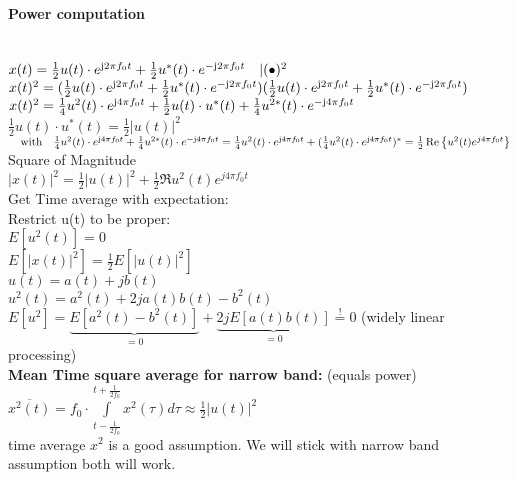 \begin{doublespace}
\ \\


\paragraph{Power computation}\ \\ 
\quad $x(t)=\frac{1}{2}u(t)\cdot e^{\mathrm{j} 2 \pi f_0 t}+\frac{1}{2}u^*(t)\cdot e^{-\mathrm{j} 2 \pi f_0 t} \quad |(\bullet)^2$\\
\quad $x(t)^2=(\frac{1}{2}u(t)\cdot e^{\mathrm{j} 2 \pi f_0 t}+\frac{1}{2}u^*(t)\cdot e^{-\mathrm{j} 2 \pi f_0 t})(\frac{1}{2}u(t)\cdot e^{\mathrm{j} 2 \pi f_0 t}+\frac{1}{2}u^*(t)\cdot e^{-\mathrm{j} 2 \pi f_0 t})$\\
\quad $x(t)^2=\frac{1}{4}u^2(t)\cdot e^{\mathrm{j} 4 \pi f_0 t}
+\frac{1}{2}u(t)\cdot u^*(t)+
\frac{1}{4}u^{2*}(t)\cdot e^{-\mathrm{j} 4 \pi f_0 t}$\\
\with $\frac{1}{2}u(t)\cdot u^*(t)=\frac{1}{2}|u(t)|^2 $\\
$ \quad\textrm{with}\quad \frac{1}{4}u^2(t)\cdot e^{\mathrm{j} 4 \pi f_0 t}+\frac{1}{4}u^{2*}(t)\cdot e^{-\mathrm{j} 4 \pi f_0 t}=\frac{1}{4}u^2(t)\cdot e^{\mathrm{j} 4 \pi f_0 t}+(\frac{1}{4}u^{2}(t)\cdot e^{\mathrm{j} 4 \pi f_0 t})^*=\frac{1}{2}\operatorname{Re}\left\{u^2(t)e^{j4\pi f_0t}\right\}$\\
Square of Magnitude\\
$|x(t)|^2= \frac{1}{2}|u(t)|^2 + \frac{1}{2}\Re{u^2(t)e^{j4\pi f_0t}}$\\
Get Time average with expectation:\\
Restrict u(t) to be proper:\\
$E[u^2(t)]=0$\\ $E[|x(t)|^2]=\frac{1}{2}E[|u(t)|^2]$\\
$u(t)= a(t)+jb(t)$\\
$u^2(t)= a^2(t) + 2j a(t)b(t) -b^2(t)$\\
$E[u^2]= \underbrace{E[a^2(t)-b^2(t)]}_{=0}+\underbrace{2jE[a(t)b(t)]}_{=0}\overset{!}{=}0$ \quad (widely linear processing)\\
\textbf{Mean Time square average for narrow band:}  (equals power)\\
$\overline{x^2(t)}=f_0 \cdot\int\limits_{t-\frac{1}{2f_0}}^{t+\frac{1}{2f_0}}x^2(\tau) d\tau \approx \frac{1}{2}|u(t)|^2 $\\
time average $x^2$ is a good assumption. \pfeil We will stick with narrow band assumption \pfeil both will work.\\
\end{doublespace}


